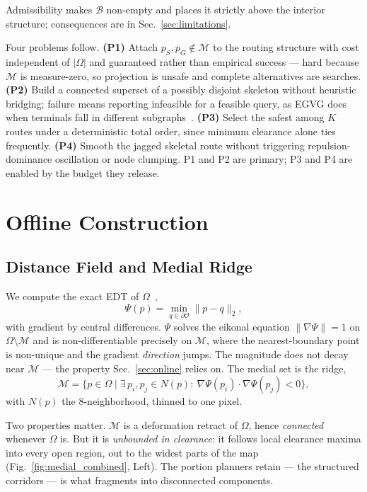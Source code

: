 \documentclass[conference]{IEEEtran}
\begin{document}
Admissibility makes $\mathcal{B}$ non-empty and places it strictly above the interior structure; consequences are in Sec.~\ref{sec:limitations}.

Four problems follow. \textbf{(P1)} Attach $p_S,p_G\notin\mathcal{M}$ to the routing structure with cost independent of $|\Omega|$ and guaranteed rather than empirical success --- hard because $\mathcal{M}$ is measure-zero, so projection is unsafe and complete alternatives are searches. \textbf{(P2)} Build a connected superset of a possibly disjoint skeleton without heuristic bridging; failure means reporting infeasible for a feasible query, as EGVG does when terminals fall in different subgraphs~\cite{qi2025egvg}. \textbf{(P3)} Select the safest among $K$ routes under a deterministic total order, since minimum clearance alone ties frequently. \textbf{(P4)} Smooth the jagged skeletal route without triggering repulsion-dominance oscillation or node clumping. P1 and P2 are primary; P3 and P4 are enabled by the budget they release.

\section{Offline Construction}
\label{sec:offline}

\subsection{Distance Field and Medial Ridge}

We compute the exact EDT of $\Omega$~\cite{felzenszwalb2012},
\begin{equation}
\Psi(p)=\min_{q\in\partial\mathcal{O}}\|p-q\|_2 ,
\end{equation}
with gradient by central differences. $\Psi$ solves the eikonal equation $\|\nabla\Psi\|=1$ on $\Omega\setminus\mathcal{M}$ and is non-differentiable precisely on $\mathcal{M}$, where the nearest-boundary point is non-unique and the gradient \emph{direction} jumps. The magnitude does not decay near $\mathcal{M}$ --- the property Sec.~\ref{sec:online} relies on. The medial set is the ridge,
\begin{equation}
\mathcal{M}=\{p\in\Omega \mid \exists\, p_i,p_j\in N(p):\ \nabla\Psi(p_i)\cdot\nabla\Psi(p_j)<0\},
\label{eq:ridge}
\end{equation}
with $N(p)$ the $8$-neighborhood, thinned to one pixel.

Two properties matter. $\mathcal{M}$ is a deformation retract of $\Omega$, hence \emph{connected} whenever $\Omega$ is. But it is \emph{unbounded in clearance}: it follows local clearance maxima into every open region, out to the widest parts of the map (Fig.~\ref{fig:medial_combined}, Left). The portion planners retain --- the structured corridors --- is what fragments into disconnected components.
\end{document}
